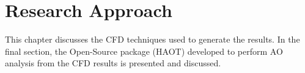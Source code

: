 \chapter{Research Approach\label{ch:ch3}} 
This chapter discusses the \gls{CFD} techniques used to generate the results. In the final section, the Open-Source package (\gls{HAOT}) developed to perform \gls{AO} analysis from the \gls{CFD} results is presented and discussed.





